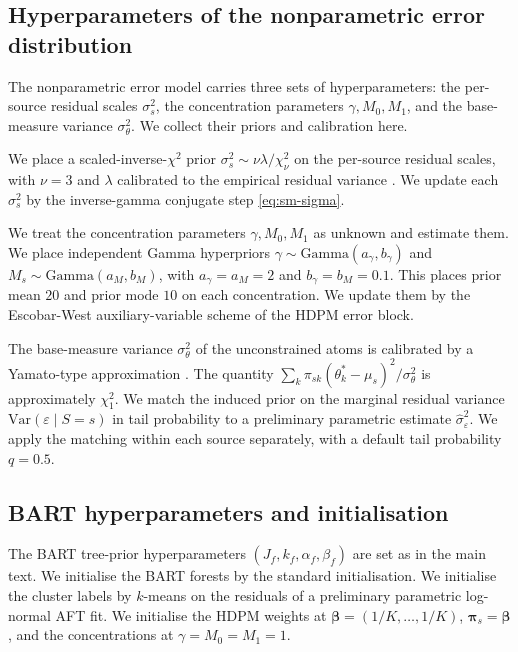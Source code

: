 \subsection{Hyperparameters of the nonparametric error distribution}

The nonparametric error model carries three sets of hyperparameters: the per-source residual scales $\sigma_s^2$, the concentration parameters $\gamma, M_0, M_1$, and the base-measure variance $\sigma_\theta^2$.
We collect their priors and calibration here.

We place a scaled-inverse-$\chi^2$ prior $\sigma_s^2 \sim \nu \lambda / \chi^2_\nu$ on the per-source residual scales, with $\nu = 3$ and $\lambda$ calibrated to the empirical residual variance \citep{chipman2010bart}.
We update each $\sigma_s^2$ by the inverse-gamma conjugate step \eqref{eq:sm-sigma}.

We treat the concentration parameters $\gamma, M_0, M_1$ as unknown and estimate them.
We place independent Gamma hyperpriors $\gamma \sim \mathrm{Gamma}(a_\gamma, b_\gamma)$ and $M_s \sim \mathrm{Gamma}(a_M, b_M)$, with $a_\gamma = a_M = 2$ and $b_\gamma = b_M = 0.1$.
This places prior mean $20$ and prior mode $10$ on each concentration.
We update them by the Escobar-West auxiliary-variable scheme of the HDPM error block.

The base-measure variance $\sigma_\theta^2$ of the unconstrained atoms is calibrated by a Yamato-type approximation \citep{yamato1984characteristic}.
The quantity $\sum_k \pi_{sk}(\theta_k^* - \mu_s)^2 / \sigma_\theta^2$ is approximately $\chi^2_1$.
We match the induced prior on the marginal residual variance $\mathrm{Var}(\varepsilon \mid S = s)$ in tail probability to a preliminary parametric estimate $\hat\sigma_\varepsilon^2$.
We apply the matching within each source separately, with a default tail probability $q = 0.5$.

\subsection{BART hyperparameters and initialisation}

The BART tree-prior hyperparameters $(J_f, k_f, \alpha_f, \beta_f)$ are set as in the main text.
We initialise the BART forests by the standard \citet{chipman2010bart} initialisation.
We initialise the cluster labels by $k$-means on the residuals of a preliminary parametric log-normal AFT fit.
We initialise the HDPM weights at $\bm{\beta} = (1/K, \ldots, 1/K)$, $\bm{\pi}_s = \bm{\beta}$, and the concentrations at $\gamma = M_0 = M_1 = 1$.

